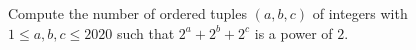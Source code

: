 Compute the number of ordered tuples $(a,b,c)$ of integers with $1\leq a,b,c\leq 2020$ such that $2^a+2^b+2^c$ is a power of $2$.
